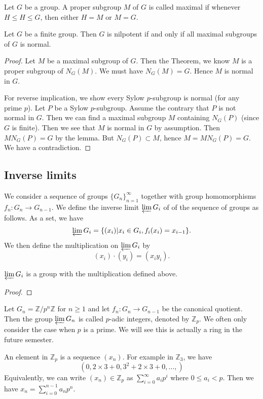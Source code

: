 \begin{defi}
    Let $G$ be a group. A proper subgroup $M$ of $G$ is called maximal if whenever $H \le H \le G$, then either $H= M$ or $M= G$.
\end{defi}
\begin{prop}
    Let $G$ be a finite group. Then $G$ is nilpotent if and only if all maximal subgroups of $G$ is normal.
\end{prop}

\begin{proof}
    Let $M$ be a maximal subgroup of $G$. Then the Theorem, we know $M$ is a proper subgroup of $N_G(M)$. We must have $N_G(M) = G$. Hence $M$ is normal in $G$.

    For reverse implication, we show every Sylow $p$-subgroup is normal (for any prime $p$). Let $P$ be a Sylow $p$-subgroup. Assume the contrary that $P$ is not normal in $G$. Then we can find a maximal subgroup $M$ containing $N_G(P)$ (since $G$ is finite). Then we see that $M$ is normal in $G$ by assumption. Then $MN_G(P) = G$ by the lemma. But $N_G(P) \subset M$, hence $M =  MN_G(P) = G$. We have a contradiction.
\end{proof}

\subsection{Inverse limits}
We consider a sequence of groups $\{G_n\}_{n=1}^{\infty}$ together with group homomorphisms $f_n: G_n \rightarrow G_{n-1}$. We define the inverse limit $\varprojlim G_i$ of of the sequence of groups as follows. As a set, we have
\[
    \varprojlim G_i = \{(x_i) \vert x_i \in G_i, f_i(x_i)= x_{i-1}\}.
\]
We then define the multiplication on $\varprojlim G_i$ by
\[
    (x_i) \cdot (y_i) = (x_iy_i).
\]

\begin{prop}
    $\varprojlim G_i$ is a group with the multiplication defined above.
\end{prop}
\begin{proof}

\end{proof}
\begin{example}
    Let $G_n = \mathbb{Z}/p^n \mathbb{Z}$ for $n \ge 1$ and let $f_n : G_n \rightarrow G_{n-1}$ be the canonical quotient. Then the group $\varprojlim G_n$ is called $p$-adic integers, denoted by $\mathbb{Z}_p$. We often only consider the case when $p$ is a prime. We will see this is actually a ring in the future semester.

    An element in $\mathbb{Z}_p$ is a sequence $(x_n)$. For example in $\mathbb{Z}_3$, we have
    \[
        (0, 2 \times 3 + 0, 3^2 + 2 \times 3 + 0, \dots, )
    \]
    Equivalently, we can write $(x_n) \in \mathbb{Z}_p$ as $ \sum_{i = 0}^\infty a_i p^i$ where $ 0\le a_i < p$. Then we have  $x_n = \sum_{i = 0}^{n-1} a_n p^n$.
\end{example}